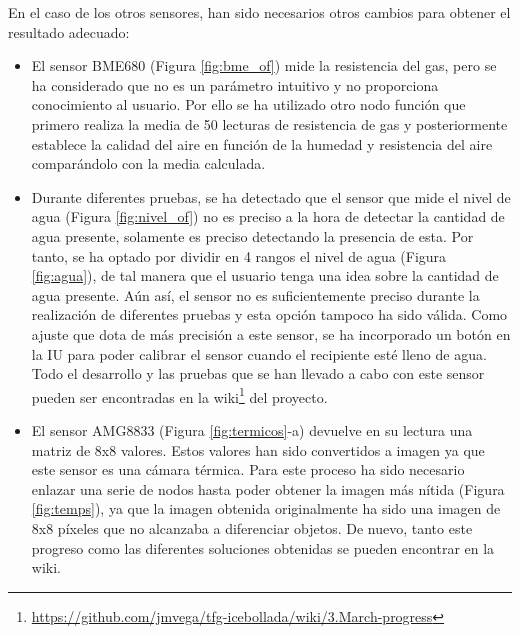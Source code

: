 En el caso de los otros sensores, han sido necesarios otros cambios para obtener el resultado adecuado:
\begin{itemize}
	\item El sensor BME680 (Figura \ref{fig:bme_of}) mide la resistencia del gas, pero se ha considerado que no es un parámetro intuitivo y no proporciona conocimiento al usuario. Por ello se ha utilizado otro nodo función que primero realiza la media de 50 lecturas de resistencia de gas y posteriormente establece la calidad del aire en función de la humedad y resistencia del aire comparándolo con la media calculada.
	
	\item Durante diferentes pruebas, se ha detectado que el sensor que mide el nivel de agua (Figura \ref{fig:nivel_of}) no es preciso a la hora de detectar la cantidad de agua presente, solamente es preciso detectando la presencia de esta. Por tanto, se ha optado por dividir en 4 rangos el nivel de agua (Figura \ref{fig:agua}), de tal manera que el usuario tenga una idea sobre la cantidad de agua presente. Aún así, el sensor no es suficientemente preciso durante la realización de diferentes pruebas y esta opción tampoco ha sido válida. Como ajuste que dota de más precisión a este sensor, se ha incorporado un botón en la IU para poder calibrar el sensor cuando el recipiente esté lleno de agua. Todo el desarrollo y las pruebas que se han llevado a cabo con este sensor pueden ser encontradas en la wiki\footnote{\url{https://github.com/jmvega/tfg-icebollada/wiki/3.March-progress}} del proyecto.
	
	\item El sensor AMG8833 (Figura \ref{fig:termicos}-a) devuelve en su lectura una matriz de 8x8 valores. Estos valores han sido convertidos a imagen ya que este sensor es una cámara térmica. Para este proceso ha sido necesario enlazar una serie de nodos hasta poder obtener la imagen más nítida (Figura \ref{fig:temps}), ya que la imagen obtenida originalmente ha sido una imagen de 8x8 píxeles que no alcanzaba a diferenciar objetos. De nuevo, tanto este progreso como las diferentes soluciones obtenidas se pueden encontrar en la wiki. 
\end{itemize}
